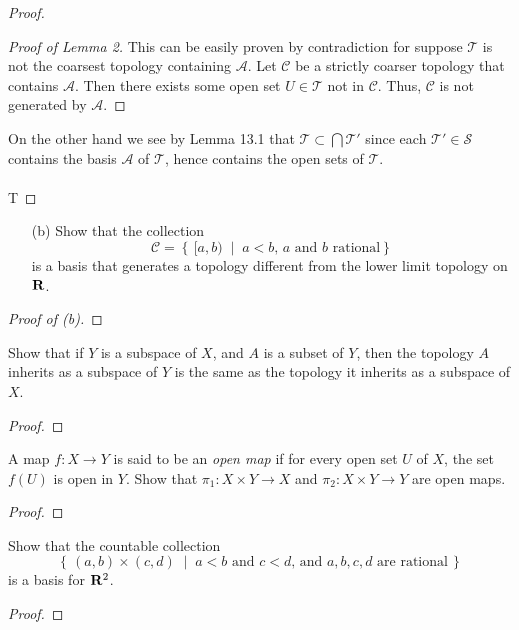 \begin{proof}
\begin{proof}[Proof of Lemma 2]
\renewcommand\qedsymbol{$\vardiamondsuit$}
This can be easily proven by contradiction for suppose
$\mathcal{T}$ is not the coarsest topology containing
$\mathcal{A}$. Let $\mathcal{C}$ be a strictly coarser topology
that contains $\mathcal{A}$. Then there exists some open set
$U\in\mathcal{T}$ not in $\mathcal{C}$. Thus, $\mathcal{C}$ is
not generated by $\mathcal{A}$.
\end{proof}
On the other hand we see by Lemma 13.1 that
$\mathcal{T}\subset\bigcap\mathcal{T}'$ since each
$\mathcal{T}'\in\mathcal{S}$ contains the basis $\mathcal{A}$ of
$\mathcal{T}$, hence contains the open sets of $\mathcal{T}$.
\\\\
T
\end{proof}
\newpage

\begin{problem}[Munkres, \S13, 8(b).]
\begin{enumerate}[noitemsep]
\item[(b)] Show that the collection
\[\mathcal{C}=\left\{\,[a,b)\;\middle|\;\text{$a<b$, $a$ and $b$ rational}\right\}\]
is a basis that generates a topology different from the lower
limit topology on $\mathbf{R}$.
\end{enumerate}
\end{problem}
\begin{proof}[Proof of (b)]

\end{proof}
\newpage

\begin{problem}[Munkres, \S16, 1.]
Show that if $Y$ is a subspace of $X$, and $A$ is a subset of
$Y$, then the topology $A$ inherits as a subspace of $Y$ is the
same as the topology it inherits as a subspace of $X$.
\end{problem}
\begin{proof}
\end{proof}
\newpage

\begin{problem}[Munkres, \S16, 4.]
A map $f\colon X\to Y$ is said to be an \emph{open map} if for
every open set $U$ of $X$, the set $f(U)$ is open in $Y$. Show
that $\pi_1\colon X\times Y\to X$ and $\pi_2\colon X\times Y\to
Y$ are open maps.
\end{problem}
\begin{proof}
\end{proof}
\newpage

\begin{problem}[Munkres, \S16, 6.]
Show that the countable collection
\[
\left\{\,(a,b)\times(c,d)\;\middle|\;
\text{$a<b$ and $c<d$, and $a,b,c,d$ are rational}\,\right\}
\]
is a basis for $\mathbf{R}^2$.
\end{problem}
\begin{proof}
\end{proof}
\newpage

